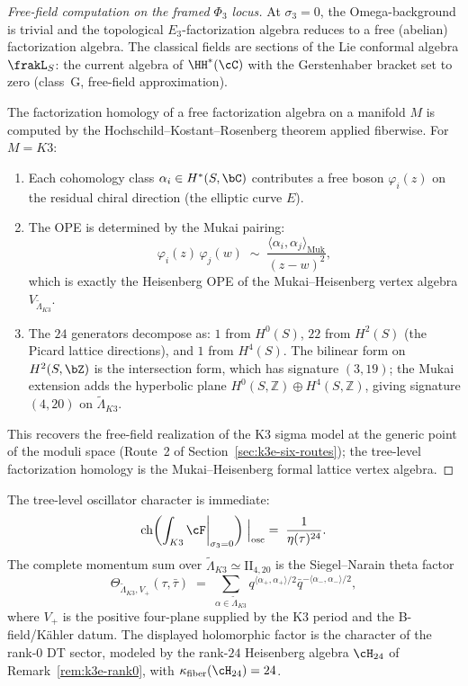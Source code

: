 \begin{proof}[Free-field computation on the framed \(\Phi_3\) locus]
At $\sigma_3 = 0$, the Omega-background is trivial and the
topological $E_3$-factorization algebra reduces to a free (abelian)
factorization algebra. The classical fields are sections of
the Lie conformal algebra $\frakL_S$: the current algebra of
$\HH^*(\cC)$ with the Gerstenhaber bracket set to zero
(class~G, free-field approximation).

The factorization homology of a free factorization algebra
on a manifold $M$ is computed by the Hochschild--Kostant--Rosenberg
theorem applied fiberwise. For $M = K3$:
\begin{enumerate}[label=(\roman*)]
\item Each cohomology class
$\alpha_i \in H^*(S, \bC)$ contributes a free boson $\varphi_i(z)$
on the residual chiral direction (the elliptic curve $E$).
\item The OPE is determined by the Mukai pairing:
\[
 \varphi_i(z)\, \varphi_j(w)
 \;\sim\;
 \frac{\langle \alpha_i, \alpha_j \rangle_{\mathrm{Muk}}}{(z - w)^2},
\]
which is exactly the Heisenberg OPE of the Mukai--Heisenberg vertex algebra
$V_{\widetilde{\Lambda}_{K3}}$.
\item The $24$ generators decompose as:
$1$ from $H^0(S)$, $22$ from $H^2(S)$ (the Picard lattice
directions), and $1$ from $H^4(S)$. The bilinear form on
$H^2(S, \bZ)$ is the intersection form, which has
signature $(3,19)$; the Mukai extension adds the hyperbolic
plane $H^0(S,\mathbb Z)\oplus H^4(S,\mathbb Z)$, giving
signature $(4,20)$ on $\widetilde{\Lambda}_{K3}$.
\end{enumerate}
This recovers the free-field realization of the K3 sigma model
at the generic point of the moduli space (Route~2 of
Section~\ref{sec:k3e-six-routes}); the tree-level factorization
homology is the Mukai--Heisenberg formal lattice vertex algebra.
\end{proof}

The tree-level oscillator character is immediate:
\begin{equation}\label{eq:k3-fact-tree-char}
 \operatorname{ch}\biggl(\int_{K3} \cF\bigg|_{\sigma_3 = 0}\biggr)
 \Bigm|_{\mathrm{osc}}
 \;=\;
 \frac{1}{\eta(\tau)^{24}}.
\end{equation}
The complete momentum sum over
$\widetilde{\Lambda}_{K3}\simeq \mathrm{II}_{4,20}$ is the
Siegel--Narain theta factor
\[
 \Theta_{\widetilde{\Lambda}_{K3},V_+}(\tau,\bar\tau)
 \;=\;
 \sum_{\alpha\in\widetilde{\Lambda}_{K3}}
 q^{\langle\alpha_+,\alpha_+\rangle/2}
 \bar q^{-\langle\alpha_-,\alpha_-\rangle/2},
\]
where $V_+$ is the positive four-plane supplied by the K3 period and
the B-field/K\"ahler datum. The displayed holomorphic factor is the
character of the rank-$0$ DT sector, modeled by the rank-$24$
Heisenberg algebra $\cH_{24}$ of Remark~\ref{rem:k3e-rank0}, with
$\kappa_{\mathrm{fiber}}(\cH_{24}) = 24$.

